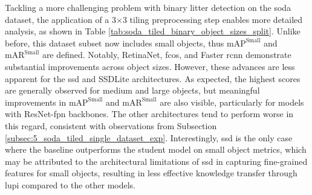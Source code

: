 Tackling a more challenging problem with binary litter detection on the \gls{soda} dataset, the application of a 3$\times$3 tiling preprocessing step enables more detailed analysis, as shown in Table \ref{tab:soda_tiled_binary_object_sizes_split}. Unlike before, this dataset subset now includes small objects, thus $\text{mAP}^{\text{Small}}$ and $\text{mAR}^{\text{Small}}$ are defined. Notably, RetinaNet, \gls{fcos}, and Faster \gls{rcnn} demonstrate substantial improvements across object sizes. However, these advances are less apparent for the \gls{ssd} and SSDLite architectures. As expected, the highest scores are generally observed for medium and large objects, but meaningful improvements in $\text{mAP}^{\text{Small}}$ and $\text{mAR}^{\text{Small}}$ are also visible, particularly for models with ResNet-\gls{fpn} backbones. The other architectures tend to perform worse in this regard, consistent with observations from Subsection \ref{subsec:5_soda_tiled_single_dataset_exp}. Interestingly, \gls{ssd} is the only case where the baseline outperforms the student model on small object metrics, which may be attributed to the architectural limitations of \gls{ssd} in capturing fine-grained features for small objects, resulting in less effective knowledge transfer through \gls{lupi} compared to the other models.

